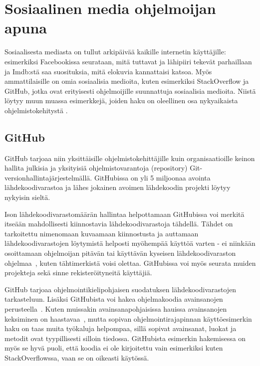 \documentclass[finnish]{tktltiki2}
\theoremstyle{definition}
\theoremstyle{remark}
\begin{document}
\section{Sosiaalinen media ohjelmoijan apuna}
\label{section:kolmastk}
Sosiaalisesta mediasta on tullut arkipäivää kaikille internetin käyttäjille: esimerkiksi Facebookissa seurataan, mitä tuttavat ja lähipiiri tekevät parhaillaan ja Imdb:stä saa  suosituksia, mitä elokuvia kannattaisi katsoa.
Myös ammattilaisille on omia sosiaalisia medioita, kuten esimerkiksi StackOverflow ja GitHub, jotka ovat erityisesti ohjelmoijille suunnattuja sosiaalisia medioita. Niistä löytyy muun muassa esimerkkejä, joiden haku on oleellinen osa nykyaikaista ohjelmistokehitystä \cite{example-overflow-social-media-for-code-recommendations}.

\subsection{GitHub}
GitHub tarjoaa niin yksittäisille ohjelmistokehittäjille kuin organisaatioille keinon hallita julkisia ja yksityisiä ohjelmistovarantoja (repository) Git-versionhallintajärjestelmällä. GitHubissa on yli 5 miljoonaa avointa lähdekoodivarastoa ja lähes jokainen avoimen lähdekoodin projekti löytyy nykyisin sieltä.

Ison lähdekoodivarastomäärän hallintaa helpottamaan GitHubissa voi merkitä itseään mahdollisesti kiinnostavia lähdekoodivarastoja tähdellä. Tähdet on tarkoitettu nimenomaan kuvaamaan kiinnostusta ja auttamaan lähdekoodivarastojen löytymistä helposti myöhempää käyttöä varten - ei niinkään osoittamaan ohjelmoijan pitävän tai käyttävän kyseisen lähdekoodivaraston ohjelmaa~\cite{social-networking-meets-se}, kuten tähtimerkistä voisi olettaa. GitHubissa voi myös seurata muiden projekteja sekä sinne rekisteröityneitä käyttäjiä.

GitHub tarjoaa ohjelmointikielipohjaisen suodatuksen lähdekoodivarastojen tarkasteluun. Lisäksi GitHubista voi hakea ohjelmakoodia avainsanojen perusteella~\cite{social-networking-meets-se}. Kuten muissakin avainsanapohjaisissa hauissa avainsanojen keksiminen on haastavaa~\cite{what-to-search-for}, mutta sopivan ohjelmointirajapinnan käyttöesimerkin haku on taas muita työkaluja helpompaa, sillä sopivat avainsanat, luokat ja metodit ovat tyypillisesti silloin tiedossa. GitHubista esimerkin hakemisessa on myös se hyvä puoli, että koodia ei ole kirjoitettu vain esimerkiksi kuten StackOverflowssa, vaan se on oikeasti käytössä.
\end{document}

